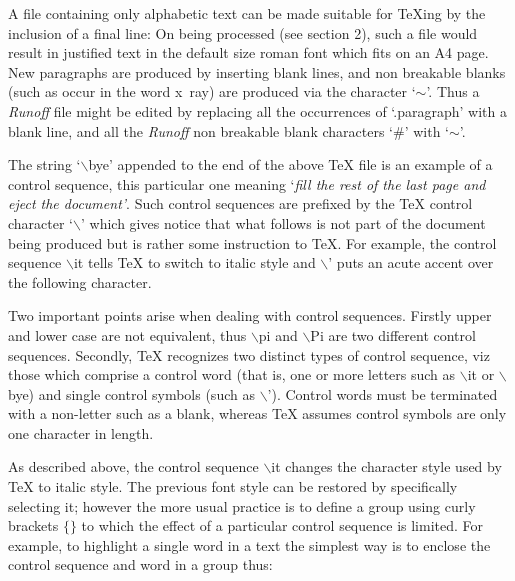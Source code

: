 \vfil\eject
{}
 
A file containing only alphabetic text can be made suitable for \TeX ing by 
the inclusion of a final line:
\medskip
{}
On being processed (see section 2), such a file would result in
justified text in the default size roman font which fits on an A4 page.
New paragraphs are produced by inserting blank lines, and non breakable blanks
(such as occur in the word x~ray) are produced via the character 
`\th$\sim$\th'. 
Thus a {\it Runoff}{} file might be edited by replacing all the occurrences of
`.paragraph' with a blank line, and all the {\it Runoff} non breakable blank
characters `\#' with `\th$\sim$\th'.



The string `$\backslash$bye' appended to the end of the above {\TeX} file 
is an example 
of a control sequence, this particular one meaning `{\it fill the rest of
the last page and eject the document'}.
Such control sequences are prefixed by the {\TeX} control character 
`$\backslash$'
 which gives 
notice that what follows is not part of the document being produced but is 
rather some instruction to \TeX. 
For example, the control sequence $\backslash$it tells {\TeX} to 
switch to italic style 
and $\backslash$' puts an acute accent over the following character.

Two important points arise when dealing with control sequences.
Firstly upper and lower case are not equivalent, thus $\backslash$pi and
$\backslash$Pi are two different control sequences.
Secondly, {\TeX} recognizes two distinct types of control sequence, viz 
those which comprise a control word (that is, one or more letters
such as $\backslash$it or $\backslash$bye) and single control symbols 
(such as $\backslash$').
Control words must be terminated with a non-letter such as a blank,
whereas {\TeX} assumes control symbols are only one character in length.



As described above, the control sequence $\backslash$it changes the 
character style used by {\TeX} to italic style. 
The previous font style can be restored by specifically selecting it;
however the more usual practice is to define a group using curly brackets
$\{$$\}$ to which the effect of a particular control sequence is limited.
For example, to highlight a single word in a text the simplest
way is to enclose the control sequence and word in a group thus:
\medskip
{}

